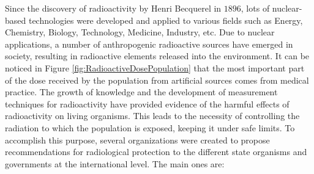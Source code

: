Since the discovery of radioactivity by Henri Becquerel in $1896$, lots of nuclear-based technologies were developed and applied to various fields such as Energy, Chemistry, Biology, Technology, Medicine, Industry, etc. Due to nuclear applications, a number of anthropogenic radioactive sources have emerged in society, resulting in radioactive elements released into the environment. It can be noticed in Figure \ref{fig:RadioactiveDosePopulation} that the most important part of the dose received by the population from artificial sources comes from medical practice. The growth of knowledge and the development of measurement techniques for radioactivity have provided evidence of the harmful effects of radioactivity on living organisms. This leads to the necessity of controlling the radiation to which the population is exposed, keeping it under safe limits. To accomplish this purpose, several organizations were created to propose recommendations for radiological protection to the different state organisms and governments at the international level. The main ones are:

